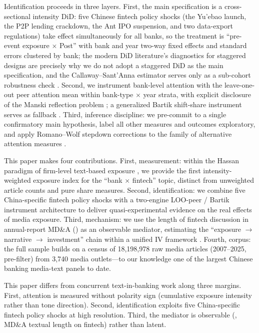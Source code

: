 Identification proceeds in three layers. First, the main specification is a
cross-sectional intensity DiD: five Chinese fintech policy shocks (the Yu'ebao
launch, the P2P lending crackdown, the Ant IPO suspension, and two data-export
regulations) take effect simultaneously for all banks, so the treatment is
``pre-event exposure $\times$ Post'' with bank and year two-way fixed effects
and standard errors clustered by bank; the modern DiD literature's diagnostics
for staggered designs \parencite{baker2022staggered} are precisely why we do
not adopt a staggered DiD as the main specification, and the
Callaway--Sant'Anna estimator serves only as a sub-cohort robustness check
\parencite{callaway2021difference}. Second, we instrument bank-level attention
with the leave-one-out peer attention mean within bank-type $\times$ year
strata, with explicit disclosure of the Manski reflection problem
\parencite{manski1993reflection,bramoulle2009peer}; a generalized Bartik
shift-share instrument serves as fallback
\parencite{goldsmith2020bartik,borusyak2022shiftshare}. Third, inference
discipline: we pre-commit to a single confirmatory main hypothesis, label all
other measures and outcomes exploratory, and apply Romano--Wolf stepdown
corrections to the family of alternative attention measures
\parencite{romanowolf2005snooping}.

This paper makes four contributions. First, measurement: within the Hassan
paradigm of firm-level text-based exposure
\parencite{hassan2019firm,sautner2023climate,hassan2023epidemic}, we provide
the first intensity-weighted exposure index for the ``bank $\times$ fintech''
topic, distinct from unweighted article counts and pure share measures.
Second, identification: we combine five China-specific fintech policy shocks
with a two-engine LOO-peer / Bartik instrument architecture to deliver
quasi-experimental evidence on the real effects of media exposure. Third,
mechanism: we use the length of fintech discussion in annual-report MD\&A
() as an observable mediator, estimating the
``exposure $\to$ narrative $\to$ investment'' chain within a unified IV
framework \parencite{dippel2020ivmediate}. Fourth, corpus: the full sample
builds on a census of 18{,}198{,}978 raw media articles (2007--2025,
pre-filter) from 3{,}740 media outlets---to our knowledge one of the largest
Chinese banking media-text panels to date.

This paper differs from concurrent text-in-banking work along three margins.
First, attention is measured without polarity sign (cumulative exposure intensity
rather than tone direction). Second, identification exploits five China-specific
fintech policy shocks at high resolution. Third, the mediator is observable
(, MD\&A textual length on fintech) rather than latent.

